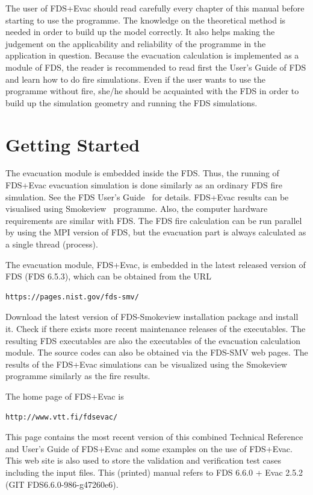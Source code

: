 \documentclass[12pt,a4paper,final,twoside]{stylevk}
\begin{document}
The user of FDS+Evac should read carefully every chapter of this
manual before starting to use the programme.  The knowledge on the
theoretical method is needed in order to build up the model correctly.
It also helps making the judgement on the applicability and
reliability of the programme in the application in question.  Because
the evacuation calculation is implemented as a module of FDS, the
reader is recommended to read first the User's Guide of FDS and learn
how to do fire simulations.  Even if the user wants to use the
programme without fire, she/he should be acquainted with the FDS in
order to build up the simulation geometry and running the FDS
simulations.


\section{Getting Started}\label{Sec_GetStart}

\noindent The evacuation module is embedded inside the FDS.  Thus, the
running of FDS+Evac evacuation simulation is done similarly as an
ordinary FDS fire simulation.  See the FDS User's
Guide~\cite{FDS_UserGuide} for details.  FDS+Evac results can be
visualised using Smokeview~\cite{SV_UserGuide,SV_TechGuide,SV_VVGuide}
programme.  Also, the computer hardware requirements are similar with
FDS.  The FDS fire calculation can be run parallel by using the MPI
version of FDS, but the evacuation part is always calculated as a
single thread (process).


The evacuation module, FDS+Evac, is embedded in the latest released
version of FDS (FDS 6.5.3), which can be obtained from the URL
\begin{verbatim}
https://pages.nist.gov/fds-smv/
\end{verbatim}
Download the latest version of FDS-Smokeview installation package and
install it.  Check if there exists more recent maintenance releases of
the executables.  The resulting FDS executables are also the
executables of the evacuation calculation module.  The source codes
can also be obtained via the FDS-SMV web pages.  The results of the
FDS+Evac simulations can be visualized using the Smokeview programme
similarly as the fire results.


The home page of FDS+Evac is 
\begin{verbatim}
http://www.vtt.fi/fdsevac/
\end{verbatim}
This page contains the most recent version of this combined Technical
Reference and User's Guide of FDS+Evac and some examples on the use of
FDS+Evac.  This web site is also used to store the validation and
verification test cases including the input files.  This (printed)
manual refers to FDS 6.6.0 + Evac 2.5.2 (GIT FDS6.6.0-986-g47260e6).
\end{document}
